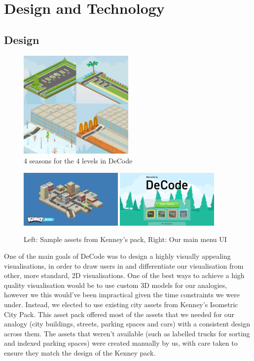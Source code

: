 \documentclass[10pt]{article}
\begin{document}
\section{Design and Technology}
\subsection{Design}
\begin{figure}
  \centering
  \includegraphics[width=0.5\textwidth]{images/seasons.png}
\caption{4 seasons for the 4 levels in DeCode}
\label{fig:seasons}
\end{figure}
\begin{figure}
  \centering
  \includegraphics[width=0.45\textwidth]{images/kenneysample.png}
  \includegraphics[width=0.45\textwidth]{images/mainmenu.png}
\caption{Left: Sample assets from Kenney's pack, Right: Our main menu UI}
\label{fig:designstuff}
\end{figure}
One of the main goals of DeCode was to design a highly visually appealing visualisations, in order to draw users in and differentiate our visualisation from other, more standard, 2D visualisations. One of the best ways to achieve a high quality visualisation would be to use custom 3D models for our analogies, however we this would've been impractical given the time constraints we were under. Instead, we elected to use existing city assets from Kenney's Isometric City Pack\cite{KenneyAssets}. This asset pack offered most of the assets that we needed for our analogy (city buildings, streets, parking spaces and cars) with a consistent design across them. The assets that weren't available (such as labelled trucks for sorting and indexed parking spaces) were created manually by us, with care taken to ensure they match the design of the Kenney pack.\par
\end{document}
